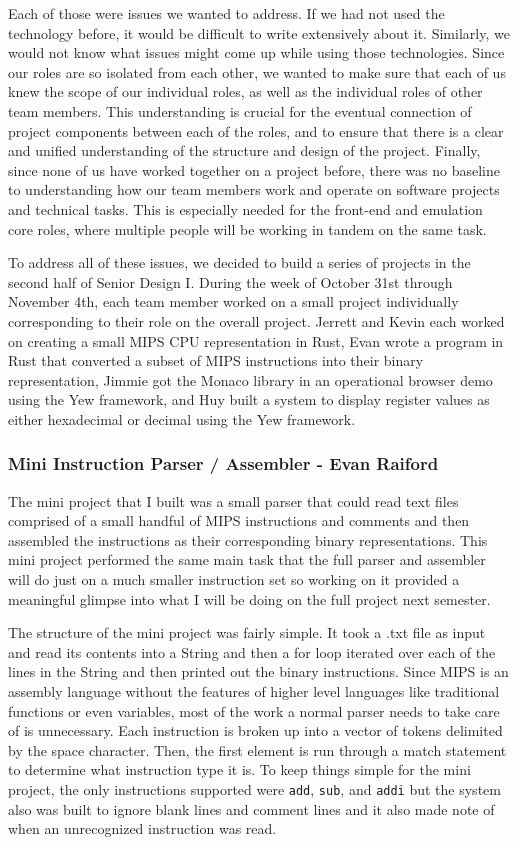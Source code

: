 \documentclass[
    paper=letter,
    parskip=half,
    fontsize=12pt,
    titlepage=firstiscover,
    toc=bibliography,
    numbers=endperiod
]{scrartcl}
\begin{document}
Each of those were issues we wanted to address. If we had not used the
technology before, it would be difficult to write extensively about it.
Similarly, we would not know what issues might come up while using those
technologies. Since our roles are so isolated from each other, we wanted
to make sure that each of us knew the scope of our individual roles, as
well as the individual roles of other team members. This understanding
is crucial for the eventual connection of project components between
each of the roles, and to ensure that there is a clear and unified
understanding of the structure and design of the project. Finally, since
none of us have worked together on a project before, there was no
baseline to understanding how our team members work and operate on
software projects and technical tasks. This is especially needed for the
front-end and emulation core roles, where multiple people will be
working in tandem on the same task.

To address all of these issues, we decided to build a series of projects
in the second half of Senior Design I. During the week of October 31st
through November 4th, each team member worked on a small project
individually corresponding to their role on the overall project. Jerrett
and Kevin each worked on creating a small MIPS CPU representation in
Rust, Evan wrote a program in Rust that converted a subset of MIPS
instructions into their binary representation, Jimmie got the Monaco
library in an operational browser demo using the Yew framework, and Huy
built a system to display register values as either hexadecimal or
decimal using the Yew framework.

\subsubsection{Mini Instruction Parser / Assembler - Evan Raiford}

The mini project that I built was a small parser that could read text
files comprised of a small handful of MIPS instructions and comments and
then assembled the instructions as their corresponding binary
representations. This mini project performed the same main task that the
full parser and assembler will do just on a much smaller instruction set
so working on it provided a meaningful glimpse into what I will be doing
on the full project next semester.

The structure of the mini project was fairly simple. It took a .txt file
as input and read its contents into a String and then a for loop
iterated over each of the lines in the String and then printed out the
binary instructions. Since MIPS is an assembly language without the
features of higher level languages like traditional functions or even
variables, most of the work a normal parser needs to take care of is
unnecessary. Each instruction is broken up into a vector of tokens
delimited by the space character. Then, the first element is run through
a match statement to determine what instruction type it is. To keep
things simple for the mini project, the only instructions supported were
\texttt{add}, \texttt{sub}, and \texttt{addi} but the system also was
built to ignore blank lines and comment lines and it also made note of
when an unrecognized instruction was read.
\end{document}
